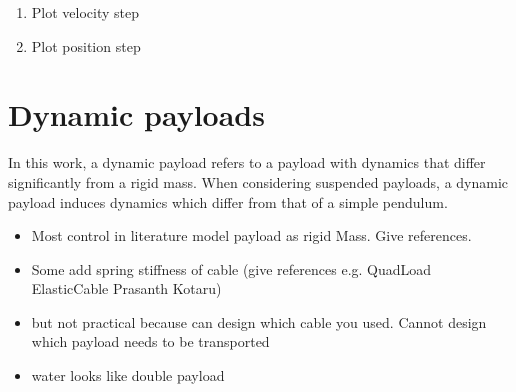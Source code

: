     \begin{enumerate}
        \item Plot velocity step
        \item Plot position step
    \end{enumerate}


\section{Dynamic payloads}

    In this work, a dynamic payload refers to a payload with dynamics that differ significantly from a rigid mass.
    When considering suspended payloads, a dynamic payload induces dynamics which differ from that of a simple pendulum.

    \begin{itemize}
        \item Most control in literature model payload as rigid Mass. Give references.
        \item Some add spring stiffness of cable (give references e.g. QuadLoad ElasticCable Prasanth Kotaru)
        \item but not practical because can design which cable you used. Cannot design which payload needs to be transported
        \item water looks like double payload
    \end{itemize}



